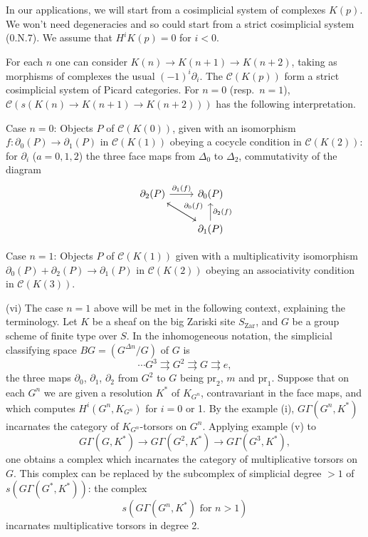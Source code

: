 \documentclass[11pt,a4paper]{article}
\theoremstyle{plain}
\theoremstyle{definition}
\newcommand{\cC}{\mathcal{C}}
\newcommand{\pr}{\mathrm{pr}}
\newcommand{\Zar}{\mathrm{Zar}}
\begin{document}
In our applications, we will start from a cosimplicial system of complexes $K(p)$. We won't need degeneracies and so could start from a strict cosimplicial system (0.N.7). We assume that $H^i K(p) = 0$ for $i < 0$.

For each $n$ one can consider $K(n) \to K(n+1) \to K(n+2)$, taking as morphisms of complexes the usual $(-1)^i \partial_i$. The $\cC(K(p))$ form a strict cosimplicial system of Picard categories. For $n=0$ (resp.~$n=1$), $\cC(s(K(n) \to K(n+1) \to K(n+2)))$ has the following interpretation.

Case $n=0$: Objects $P$ of $\cC(K(0))$, given with an isomorphism $f: \partial_0(P) \to \partial_1(P)$ in $\cC(K(1))$ obeying a cocycle condition in $\cC(K(2))$: for $\partial_i$ ($a = 0,1,2$) the three face maps from $\Delta_0$ to $\Delta_2$, commutativity of the diagram
\[
\begin{tikzcd}
\partial_2(P) \arrow[r, "{\partial_1(f)}"] \arrow[rd] & \partial_0(P) \\
& \partial_1(P) \arrow[u, "{\partial_2(f)}"'] \arrow[ul, "{\partial_0(f)}"']
\end{tikzcd}
\]

Case $n = 1$: Objects $P$ of $\cC(K(1))$ given with a multiplicativity isomorphism $\partial_0(P) + \partial_2(P) \to \partial_1(P)$ in $\cC(K(2))$ obeying an associativity condition in $\cC(K(3))$.

(vi) The case $n=1$ above will be met in the following context, explaining the terminology. Let $K$ be a sheaf on the big Zariski site $S_{\Zar}$, and $G$ be a group scheme of finite type over $S$. In the inhomogeneous notation, the simplicial classifying space $BG = (G^{\Delta n}/G)$ of $G$ is
\[\cdots G^3 \rightrightarrows G^2 \rightrightarrows G \rightrightarrows e,\]
the three maps $\partial_0$, $\partial_1$, $\partial_2$ from $G^2$ to $G$ being $\pr_2$, $m$ and $\pr_1$. Suppose that on each $G^n$ we are given a resolution $K^*$ of $K_{G^n}$, contravariant in the face maps, and which computes $H^i(G^n, K_{G^n})$ for $i = 0$ or 1. By the example (i), $G\Gamma(G^n, K^*)$ incarnates the category of $K_{G^n}$-torsors on $G^n$. Applying example (v) to
\[G\Gamma(G, K^*) \to G\Gamma(G^2, K^*) \to G\Gamma(G^3, K^*),\]
one obtains a complex which incarnates the category of multiplicative torsors on $G$. This complex can be replaced by the subcomplex of simplicial degree $> 1$ of $s(G\Gamma(G^*, K^*))$: the complex
\begin{equation}\label{eq:1.9.1}
s(G\Gamma(G^n, K^*) \text{ for } n > 1)
\end{equation}
incarnates multiplicative torsors in degree 2.
\end{document}
